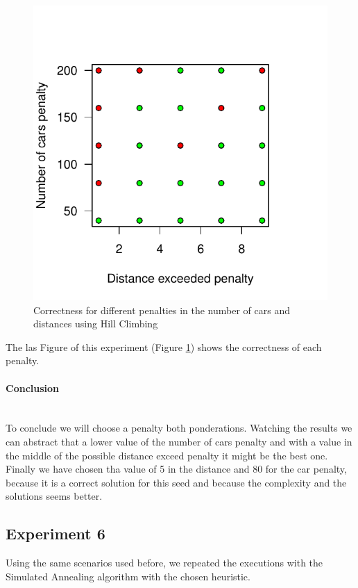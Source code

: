 \documentclass[12]{article}
\begin{document}
\begin{figure}[H]
  \captionsetup{justification=centering}
   \centering
    \includegraphics[scale=0.8]{Results/data_5_4.pdf}
      \caption{Correctness for different penalties in the number of cars and distances using Hill Climbing}
      \label{fig:data_5_4}
  \end{figure}
    \vspace{1cm}

The las Figure of this experiment (Figure \ref{fig:data_5_4}) shows the correctness of each penalty.
    
\paragraph{Conclusion}\mbox{}\\

To conclude we will choose a penalty both ponderations. Watching the results we can abstract that a lower value of the number of cars penalty and with a value in the middle of the possible distance exceed penalty it might be the best one.
Finally we have chosen tha value of 5 in the distance and 80 for the car penalty, because it is a correct solution for this seed and because the complexity and the solutions seems better.

\subsection{Experiment 6}
Using the same scenarios used before, we repeated the executions with the Simulated Annealing algorithm with the chosen heuristic.
\end{document}
